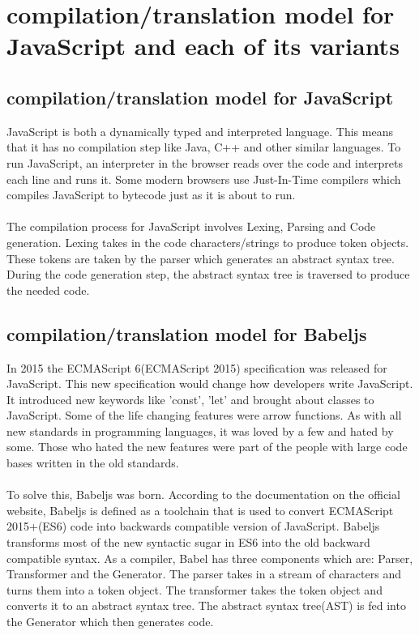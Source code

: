 \section{compilation/translation model for JavaScript and each of its variants}
\subsection{compilation/translation model for JavaScript}
JavaScript is both a dynamically typed and interpreted language. This means that it has no compilation step like Java, C++ and other similar languages. To run JavaScript, an interpreter in the browser reads over the code and interprets each line and runs it. Some modern browsers use Just-In-Time compilers which compiles JavaScript to bytecode just as it is about to run.
\paragraph{}
The compilation process for JavaScript involves Lexing, Parsing and Code generation. Lexing takes in the code characters/strings to produce token objects. These tokens are taken by the parser which generates an abstract syntax tree. During the code generation step, the abstract syntax tree is traversed to produce the needed code\cite{jss}.
\subsection{compilation/translation model for Babeljs}
In 2015 the ECMAScript 6(ECMAScript 2015) specification was released for JavaScript. This new specification would change how developers write JavaScript. It introduced new keywords like 'const', 'let' and brought about classes to JavaScript. Some of the life changing features were arrow functions. As with all new standards in programming languages, it was loved by a few and hated by some. Those who hated the new features were part of the people with large code bases written in the old standards. 
\paragraph{}
To solve this, Babeljs was born. According to the documentation on the official website, Babeljs is defined as a toolchain that is used to convert ECMAScript 2015+(ES6) code into backwards compatible version of JavaScript\cite{babel}. Babeljs transforms most of the new syntactic sugar in ES6 into the old backward compatible syntax. As a compiler, Babel has three components which are: Parser, Transformer and the Generator. The parser takes in a stream of characters and turns them into a token object. The transformer takes the token object and converts it to an abstract syntax tree. The abstract syntax tree(AST) is fed into the Generator which then generates code\cite{babeltalk}.
